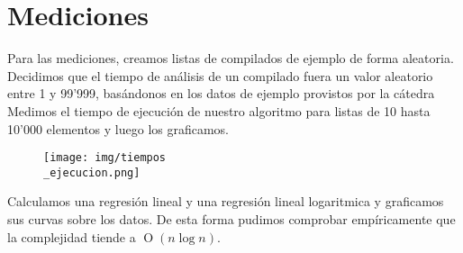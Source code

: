 \section{Mediciones}

Para las mediciones, creamos listas de compilados de ejemplo de forma aleatoria. Decidimos que el tiempo
de análisis de un compilado fuera un valor aleatorio entre 1 y 99'999, basándonos en los datos de ejemplo
provistos por la cátedra
Medimos el tiempo de ejecución de nuestro algoritmo para listas de 10 hasta 10'000 elementos
y luego los graficamos.

\begin{figure}[H]
    \centering
    \texttt{[image: img/tiempos\\\_ejecucion.png]}
\end{figure}

Calculamos una regresión lineal y una regresión lineal logaritmica y graficamos sus curvas sobre los datos.
De esta forma pudimos comprobar empíricamente que la complejidad tiende a $\operatorname{O}(n\log{n})$.